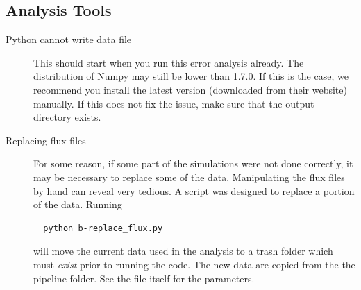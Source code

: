 \documentclass[a4paper,10pt]{article}
\begin{document}
\subsection{Analysis Tools}
\begin{description}
 \item [Python cannot write data file] This should start when you run this error analysis already. The distribution of Numpy may still be lower than 1.7.0. If this is the case, we recommend you install the latest version (downloaded from their website) manually. If this does not fix the issue, make sure that the output directory exists.
  \item [Replacing flux files] For some reason, if some part of the simulations were not done correctly, it may be necessary to replace some of the data. Manipulating the flux files by hand can reveal very tedious. A script was designed to replace a portion of the data. Running 
 \begin{lstlisting}
  python b-replace_flux.py
 \end{lstlisting}
 will move the current data used in the analysis to a trash folder which must \emph{exist} prior to running the code. The new data are copied from the the pipeline folder. See the file itself for the parameters.
\end{description}
\end{document}
